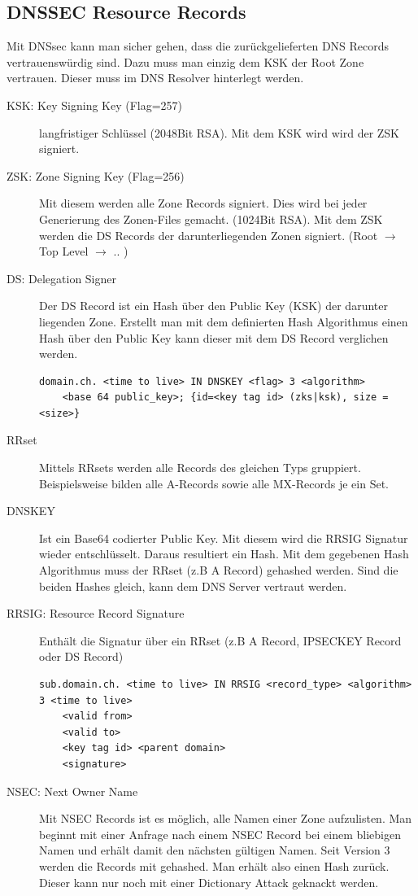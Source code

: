 \subsection{DNSSEC Resource Records}
Mit DNSsec kann man sicher gehen, dass die zurückgelieferten DNS Records vertrauenswürdig sind. Dazu muss man einzig dem KSK der Root Zone vertrauen. Dieser muss im DNS Resolver hinterlegt werden.
\begin{description}
	\item[KSK: Key Signing Key (Flag=257)] langfristiger Schlüssel (2048Bit RSA). Mit dem KSK wird wird der ZSK signiert.
	\item[ZSK: Zone Signing Key (Flag=256)] Mit diesem werden alle Zone Records signiert. Dies wird bei jeder Generierung des Zonen-Files gemacht. (1024Bit RSA). Mit dem ZSK werden die DS Records der darunterliegenden Zonen signiert. (Root $\rightarrow$ Top Level $\rightarrow$ .. ) 
	\item[DS: Delegation Signer] 
	Der DS Record ist ein Hash über den Public Key (KSK) der darunter liegenden Zone. Erstellt man mit dem definierten Hash Algorithmus einen Hash über den Public Key kann dieser mit dem DS Record verglichen werden.
	\begin{lstlisting}[caption=DNSKEY]
	domain.ch. <time to live> IN DNSKEY <flag> 3 <algorithm>
	<base 64 public_key>; {id=<key tag id> (zks|ksk), size = <size>}
	\end{lstlisting}
	\item[RRset] Mittels RRsets werden alle Records des gleichen Typs gruppiert. Beispielsweise bilden alle A-Records sowie alle MX-Records je ein Set.
	\item[DNSKEY] Ist ein Base64 codierter Public Key. Mit diesem wird die RRSIG Signatur wieder entschlüsselt. Daraus resultiert ein Hash. Mit dem gegebenen Hash Algorithmus muss der RRset (z.B A Record) gehashed werden. Sind die beiden Hashes gleich, kann dem DNS Server vertraut werden.
	\item[RRSIG: Resource Record Signature] Enthält die Signatur über ein RRset (z.B A Record, IPSECKEY Record oder DS Record)
	\begin{lstlisting}[caption=RRSIG]
	sub.domain.ch. <time to live> IN RRSIG <record_type> <algorithm> 3 <time to live>
	<valid from>
	<valid to>
	<key tag id> <parent domain>
	<signature>
	\end{lstlisting}
	\item[NSEC: Next Owner Name] Mit NSEC Records ist es möglich, alle Namen einer Zone aufzulisten. Man beginnt mit einer Anfrage nach einem NSEC Record bei einem bliebigen Namen und erhält damit den nächsten gültigen Namen. Seit Version 3 werden die Records mit gehashed. Man erhält also einen Hash zurück. Dieser kann nur noch mit einer Dictionary Attack geknackt werden.
\end{description}



